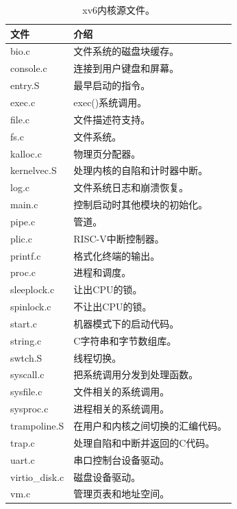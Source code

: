\begin{table}[htbp]
    \centering
    \begin{tabular}{l|l}
        \textbf{文件}   & \textbf{介绍} \\
        \hline
        bio.c       & 文件系统的磁盘块缓存。    \\
        console.c   & 连接到用户键盘和屏幕。    \\
        entry.S     & 最早启动的指令。         \\
        exec.c      & exec()系统调用。        \\
        file.c       & 文件描述符支持。         \\
        fs.c        & 文件系统。              \\
        kalloc.c    & 物理页分配器。           \\
        kernelvec.S & 处理内核的自陷和计时器中断。  \\
        log.c       & 文件系统日志和崩溃恢复。   \\
        main.c      & 控制启动时其他模块的初始化。\\
        pipe.c      & 管道。                  \\
        plic.c      & RISC-V中断控制器。       \\
        printf.c    & 格式化终端的输出。        \\
        proc.c      & 进程和调度。             \\
        sleeplock.c & 让出CPU的锁。            \\
        spinlock.c  & 不让出CPU的锁。           \\
        start.c     & 机器模式下的启动代码。      \\
        string.c    & C字符串和字节数组库。       \\
        swtch.S     & 线程切换。                \\
        syscall.c   & 把系统调用分发到处理函数。   \\
        sysfile.c   & 文件相关的系统调用。         \\
        sysproc.c   & 进程相关的系统调用。        \\
        trampoline.S& 在用户和内核之间切换的汇编代码。\\
        trap.c      & 处理自陷和中断并返回的C代码。 \\
        uart.c      & 串口控制台设备驱动。         \\
        virtio\_disk.c  & 磁盘设备驱动。          \\
        vm.c        & 管理页表和地址空间。         \\
    \end{tabular}
    \caption{xv6内核源文件。}
    \label{t2-1}
\end{table}

